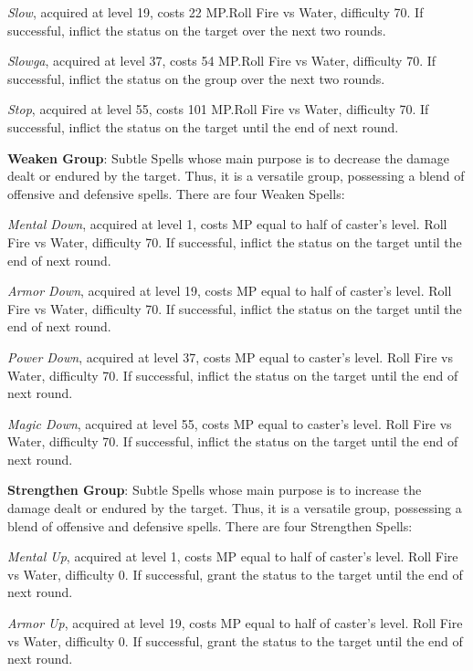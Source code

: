 \begin{multicols}{2}
    \textit{Slow}, acquired at level 19, costs 22 MP.\@{}Roll Fire vs Water, difficulty 70. If successful, inflict the  status on the target over the next two rounds.
    
    \textit{Slowga}, acquired at level 37, costs 54 MP.\@{}Roll Fire vs Water, difficulty 70. If successful, inflict the  status on the group over the next two rounds.
    
    \textit{Stop}, acquired at level 55, costs 101 MP.\@{}Roll Fire vs Water, difficulty 70. If successful, inflict the  status on the target until the end of next round.
    
    \textbf{Weaken Group}: Subtle Spells whose main purpose is to decrease the damage dealt or endured by the target. Thus, it is a versatile group, possessing a blend of offensive and defensive spells. There are four Weaken Spells:
    
    \textit{Mental Down}, acquired at level 1, costs MP equal to half of caster's level. Roll Fire vs Water, difficulty 70. If successful, inflict the  status on the target until the end of next round.
    
    \textit{Armor Down}, acquired at level 19, costs MP equal to half of caster's level. Roll Fire vs Water, difficulty 70. If successful, inflict the  status on the target until the end of next round.
    
    \textit{Power Down}, acquired at level 37, costs MP equal to caster's level. Roll Fire vs Water, difficulty 70. If successful, inflict the  status on the target until the end of next round.
    
    \textit{Magic Down}, acquired at level 55, costs MP equal to caster's level. Roll Fire vs Water, difficulty 70. If successful, inflict the  status on the target until the end of next round.
    
    \textbf{Strengthen Group}: Subtle Spells whose main purpose is to increase the damage dealt or endured by the target. Thus, it is a versatile group, possessing a blend of offensive and defensive spells. There are four Strengthen Spells:
    
    \textit{Mental Up}, acquired at level 1, costs MP equal to half of caster's level. Roll Fire vs Water, difficulty 0. If successful, grant the  status to the target until the end of next round.

    \textit{Armor Up}, acquired at level 19, costs MP equal to half of caster's level. Roll Fire vs Water, difficulty 0. If successful, grant the  status to the target until the end of next round.
    

\end{multicols}
